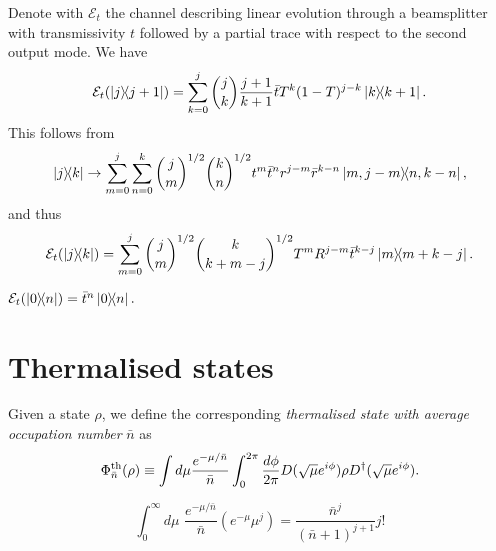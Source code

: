 \documentclass[12pt]{report}
\newcommand{\calE}{{\mathcal{E}}}
\begin{document}
\begin{example}
	Denote with $\calE_t$ the channel describing linear evolution through a beamsplitter with transmissivity $t$ followed by a partial trace with respect to the second output mode. We have
	\begin{equation}
		\calE_t(\ketbra{j}{j+1})
		= \sum_{k=0}^j \binom{j}{k} \frac{j+1}{k+1}
		\bar t T^k (1-T)^{j-k} \ketbra{k}{k+1}.
	\end{equation}
	This follows from
	\begin{equation}
		\ketbra{j}{k} \to
		\sum_{m=0}^j \sum_{n=0}^k
		\binom{j}{m}^{1/2} \binom{k}{n}^{1/2}
		t^{m} \bar t^n r^{j-m} \bar r^{k-n}
		\ketbra{m,j-m}{n,k-n},
	\end{equation}
	and thus
	\begin{equation}
		\calE_t(\ketbra{j}{k})
		= \sum_{m=0}^j \binom{j}{m}^{1/2} \binom{k}{k+m-j}^{1/2}
		T^m R^{j-m} \bar t^{k-j}
		\ketbra{m}{m+k-j}.
	\end{equation}
\end{example}

\begin{example}
		$\calE_t(\ketbra{0}{n})
				= \bar t^n \ketbra{0}{n}.$
\end{example}

\section{Thermalised states}

\begin{defn}
	Given a state $\rho$, we define the corresponding \emph{thermalised state with average occupation number} $\bar n$ as
	\begin{equation}
		\Phi_{\bar n}^{\rm th}(\rho)
		\equiv \int d\mu \frac{e^{-\mu/\bar n}}{\bar n}
		\int_0^{2\pi} \frac{d\phi}{2\pi}
		D(\sqrt\mu e^{i\phi})\rho D^\dagger(\sqrt\mu e^{i\phi}).
	\end{equation}
\end{defn}

\begin{prop}\label{prop:integration_formula_for_thermalisation}
	\begin{equation}
		\int_0^\infty d\mu \,\, \frac{e^{-\mu/\bar n}}{\bar n}
		(e^{-\mu}\mu^j)
		= \frac{\bar n^j}{(\bar n+1)^{j+1}} j!
	\end{equation}
\end{prop}
\end{document}
